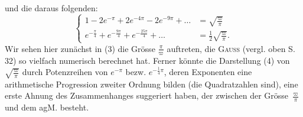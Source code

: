 \endgroup
{}
\noindent und die daraus folgenden:
\begingroup\makeatletter\tagsleft@true\let\veqno\leqno\makeatother
\begin{equation*}\tag*{(4)}
\left\{\begin{aligned}
1-2e^{-\pi}+2e^{-4\pi}-2e^{-9\pi}+\ldots&=\sqrt{\frac{\varpi}{\pi}}\\[1ex]
e^{-\frac{\pi}{4}}+e^{-\frac{9\pi}{4}}+e^{-\frac{25\pi}{4}}+\ldots&=\frac12\sqrt{\frac{\varpi}{\pi}}.
\end{aligned}\right.
\end{equation*}
\endgroup
\clearpage{}
Wir sehen hier zunächst in (3) die Grösse \(\frac{\pi}{\varpi}\) auftreten, die \textsc{Gauss} (vergl.
oben S. 32) so vielfach numerisch berechnet hat. Ferner könnte die Darstellung
(4) von \(\sqrt{\frac{\varpi}{\pi}}\) durch Potenzreihen von \(e^{-\pi}\) bezw. \(e^{-\frac14\pi}\), deren Exponenten
eine arithmetische Progression zweiter Ordnung bilden (die Quadratzahlen
sind), eine erste Ahnung des Zusammenhanges suggeriert haben, der
zwischen der Grösse \(\frac{\varpi}{\pi}\) und dem agM. besteht.

